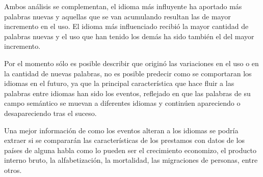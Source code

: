 Ambos análisis se complementan,  el idioma más influyente ha aportado más palabras nuevas y aquellas que se van acumulando resultan las de mayor incremento en el uso. El idioma más influenciado recibió la mayor cantidad de palabras nuevas y el uso que han tenido los demás ha sido también el del mayor incremento. 

Por el momento sólo es posible describir que originó las variaciones en el uso o en la cantidad de nuevas palabras, no es posible predecir como se comportaran los idiomas en el futuro, ya que la principal característica que  hace fluir a las palabras entre idiomas han sido los eventos, reflejado en que las palabras de su campo semántico  se muevan a diferentes idiomas y continúen apareciendo o desapareciendo tras el suceso. 

Una mejor información de como los eventos alteran a los idiomas se podría extraer si se compararán las características de los prestamos con  datos de los países de alguna habla como lo pueden ser  el crecimiento economizo, el producto interno bruto, la alfabetización, la mortalidad, las migraciones de personas, entre otros.






